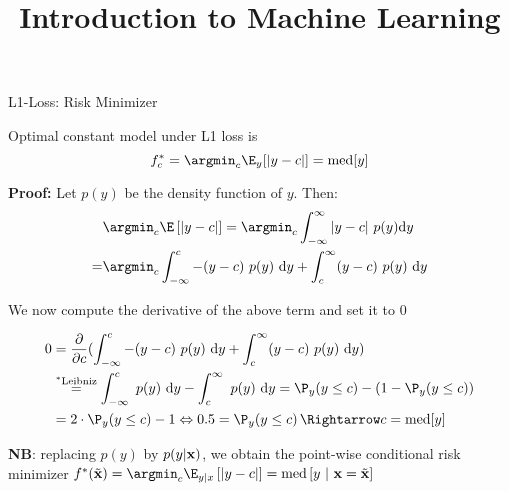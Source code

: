 \documentclass[11pt,compress,t,notes=noshow, xcolor=table]{beamer}
\title{Introduction to Machine Learning}
\begin{document}

\begin{frame2}[footnotesize]{L1-Loss: Risk Minimizer}

Optimal constant model under L1 loss is
$$f_{c}^{\ast} = \argmin_c \E_y[|y-c|] =  \text{med} [y]$$

\textbf{Proof:} Let $p(y)$ be the density function of $y$. Then: 
\begin{align*}
&\argmin_c \E\left[|y - c|\right] = \argmin_c \int_{-\infty}^\infty |y - c| ~ p(y) \text{d}y \\
=& \argmin_c \int_{-\infty}^c -(y - c)~p(y)~\text{d}y + \int_c^\infty (y - c)~p(y)~\text{d}y 
\end{align*}

We now compute the derivative of the above term and set it to $0$

\begin{align*}
0 &= \frac{\partial}{\partial c} (\int_{-\infty}^c -(y - c)~p(y)~\text{d}y + \int_c^\infty (y - c)~p(y)~\text{d}y) \\ &\overset{^\ast\text{Leibniz}}{=} \int_{-\infty}^c  ~p(y)~\text{d}y - \int_c^\infty ~p(y)~\text{d}y =   \P_y (y \le c) - (1 - \P_y (y \le c)) \\
&= 2 \cdot \P_y (y \le c) - 1 \Leftrightarrow 0.5 = \P_y (y \le c) \,\Rightarrow c = \text{med}[y]
\end{align*}

\textbf{NB}: replacing $p(y)$ by $p(y|\mathbf{x})$, we obtain the point-wise conditional risk minimizer
$f^{\ast}(\xtil) = \argmin_c \E_{y|x}\left[|y - c|\right]= \text{med}\left[y ~|~ \xv = \xtil \right]$

\end{frame2}
\end{document}
